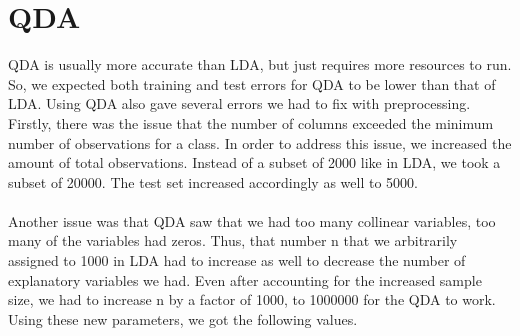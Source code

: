 \documentclass[10pt]{extarticle}
\begin{document}
\section{QDA} %

QDA is usually more accurate than LDA, but just requires more resources to run. So, we expected both training and test errors for QDA to be lower than that of LDA. Using QDA also gave several errors we had to fix with preprocessing. Firstly, there was the issue that the number of columns exceeded the minimum number of observations for a class. In order to address this issue, we increased the amount of total observations. Instead of a subset of 2000 like in LDA, we took a subset of 20000. The test set increased accordingly as well to 5000.\\\\
Another issue was that QDA saw that we had too many collinear variables, too many of the variables had zeros. Thus, that number n that we arbitrarily assigned to 1000 in LDA had to increase as well to decrease the number of explanatory variables we had. Even after accounting for the increased sample size, we had to increase n by a factor of 1000, to 1000000 for the QDA to work. Using these new parameters, we got the following values.
\end{document}
